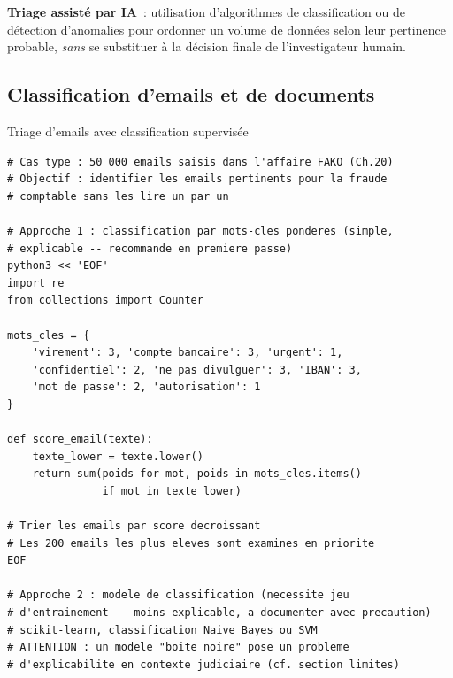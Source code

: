\begin{boxdef}
\textbf{Triage assisté par IA}~:
utilisation d'algorithmes de classification ou de détection
d'anomalies pour ordonner un volume de données selon leur pertinence
probable, \emph{sans} se substituer à la décision finale de
l'investigateur humain.
\end{boxdef}

\subsection{Classification d'emails et de documents}

\begin{boxoutils}{Triage d'emails avec classification supervisée}
\begin{lstlisting}[language=bash_forensique]
# Cas type : 50 000 emails saisis dans l'affaire FAKO (Ch.20)
# Objectif : identifier les emails pertinents pour la fraude
# comptable sans les lire un par un

# Approche 1 : classification par mots-cles ponderes (simple,
# explicable -- recommande en premiere passe)
python3 << 'EOF'
import re
from collections import Counter

mots_cles = {
    'virement': 3, 'compte bancaire': 3, 'urgent': 1,
    'confidentiel': 2, 'ne pas divulguer': 3, 'IBAN': 3,
    'mot de passe': 2, 'autorisation': 1
}

def score_email(texte):
    texte_lower = texte.lower()
    return sum(poids for mot, poids in mots_cles.items()
               if mot in texte_lower)

# Trier les emails par score decroissant
# Les 200 emails les plus eleves sont examines en priorite
EOF

# Approche 2 : modele de classification (necessite jeu
# d'entrainement -- moins explicable, a documenter avec precaution)
# scikit-learn, classification Naive Bayes ou SVM
# ATTENTION : un modele "boite noire" pose un probleme
# d'explicabilite en contexte judiciaire (cf. section limites)
\end{lstlisting}
\end{boxoutils}

